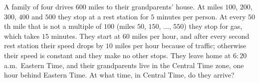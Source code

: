 A family of four drives $600$ miles to their grandparents' house. At miles $100$, $200$, $300$, $400$ and $500$ they stop at a rest station for $5$ minutes per person. At every $50$th mile that is not a multiple of $100$ (miles $50$, $150$, $\dots$, $550$) they stop for gas, which takes $15$ minutes. They start at $60$ miles per hour, and after every second rest station their speed drops by $10$ miles per hour because of traffic; otherwise their speed is constant and they make no other stops. They leave home at $6{:}20$ a.m.\ Eastern Time, and their grandparents live in the Central Time zone, one hour behind Eastern Time. At what time, in Central Time, do they arrive?
